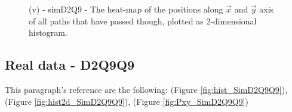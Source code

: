 \documentclass[class=article, crop=false]{standalone}
\begin{document}
\begin{figure}[!htb]
    \centering
        \quad\quad
    \caption{(v) - simD2Q9 - The heat-map of the positions along $\vec x$ and $\vec y$ axis of all paths that have passed though, plotted as 2-dimensional histogram.}
    \label{fig:Pxy_SimD2Q9}
\end{figure}


\FloatBarrier

\subsection{Real data - D2Q9Q9}
This paragraph's reference are the following: (Figure \ref{fig:hist_SimD2Q9Q9}), (Figure \ref{fig:hist2d_SimD2Q9Q9}), (Figure \ref{fig:Pxy_SimD2Q9Q9}) 
\end{document}
